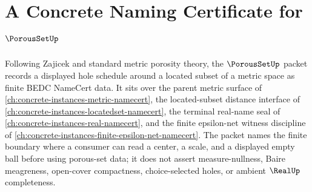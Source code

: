\chapter{A Concrete Naming Certificate for $\PorousSetUp$}
\label{ch:concrete-instances-porous-set-namecert}

Following Zajicek and standard metric porosity theory, the $\PorousSetUp$ packet records a displayed hole schedule around a located subset of a metric space as finite BEDC NameCert data. It sits over the parent metric surface of \autoref{ch:concrete-instances-metric-namecert}, the located-subset distance interface of \autoref{ch:concrete-instances-locatedset-namecert}, the terminal real-name seal of \autoref{ch:concrete-instances-real-namecert}, and the finite epsilon-net witness discipline of \autoref{ch:concrete-instances-finite-epsilon-net-namecert}. The packet names the finite boundary where a consumer can read a center, a scale, and a displayed empty ball before using porous-set data; it does not assert measure-nullness, Baire meagreness, open-cover compactness, choice-selected holes, or ambient $\RealUp$ completeness.

